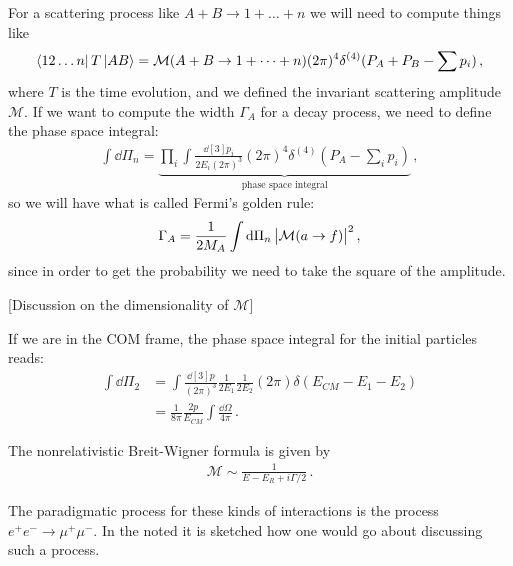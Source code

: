 \documentclass[main.tex]{subfiles}
\begin{document}
For a scattering process like \(A+B \rightarrow 1 + \dots + n\)
we will need to compute things like 
%
\begin{align}
\bra{12 \dots n} T \ket{AB} = \mathcal{M} (A+B \rightarrow 1 + \dots + n) (2\pi )^{4} \delta^{(4)} (P_A + P_B - \sum p_i)
\,,
\end{align}
%
where \(T\) is the time evolution, and we defined the invariant scattering amplitude \(\mathcal{M}\). 
If we want to compute the width \(\Gamma_{A}\) for a decay process, we need to define the phase space integral:
%
\begin{align}
\int \dd{\Pi_{n}} = \underbrace{\prod_{i} \int \frac{ \dd[3]{p_i}}{2 E_i (2 \pi )^3} 
(2\pi )^{4} \delta^{(4)} (P_A - \sum _{i} p_i)}_{\text{phase space integral}}
\,,
\end{align}
%
so we will have what is called Fermi's golden rule:
%
\begin{align}
\Gamma_{A} = \frac{1}{2 M_A} \int \dd{\Pi_{n}} \abs{\mathcal{M} (a \rightarrow f)}^2
\,,
\end{align}
%
since in order to get the probability we need to take the square of the amplitude. 

[Discussion on the dimensionality of \(\mathcal{M}\)]

If we are in the COM frame, the phase space integral for the initial particles reads: 
%
\begin{subequations}
\begin{align}
\int \dd{\Pi_{2}} &= \int \frac{\dd[3]{p}}{(2 \pi )^3} \frac{1}{2 E_1 } \frac{1}{2 E_2 } (2 \pi ) \delta (E_{CM} - E_1 - E_2 )   \\
&= \frac{1}{8 \pi } \frac{2p}{E_{CM}} \int  \frac{\dd{\Omega}}{4 \pi } 
\,.
\end{align}
\end{subequations}

The nonrelativistic Breit-Wigner formula is given by 
%
\begin{align}
\mathcal{M} \sim \frac{1}{E - E_R + i \Gamma/ 2}  
\,.
\end{align}

The paradigmatic process for these kinds of interactions is the process \(e^{+}e^{-} \to \mu^{+}\mu^- \). 
In the noted it is sketched how one would go about discussing such a process. 

\end{document}
